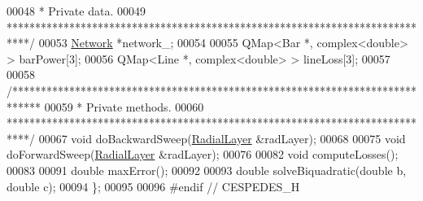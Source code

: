 \begin{DoxyCode}
00048 \textcolor{comment}{   * Private data.}
00049 \textcolor{comment}{   ****************************************************************************/}
00053   \hyperlink{class_network}{Network} *network\_;
00054   
00055   QMap<Bar *, complex<double> > barPower[3];
00056   QMap<Line *, complex<double> > lineLoss[3];
00057 
00058   \textcolor{comment}{/*****************************************************************************}
00059 \textcolor{comment}{   * Private methods.}
00060 \textcolor{comment}{   ****************************************************************************/}
00067   \textcolor{keywordtype}{void} doBackwardSweep(\hyperlink{class_radial_layer}{RadialLayer} &radLayer);
00068 
00075   \textcolor{keywordtype}{void} doForwardSweep(\hyperlink{class_radial_layer}{RadialLayer} &radLayer);
00076 
00082   \textcolor{keywordtype}{void} computeLosses();
00083 
00091   \textcolor{keywordtype}{double} maxError();
00092   
00093   \textcolor{keywordtype}{double} solveBiquadratic(\textcolor{keywordtype}{double} b, \textcolor{keywordtype}{double} c);
00094 \};
00095 
00096 \textcolor{preprocessor}{#endif // CESPEDES\_H}
\end{DoxyCode}
